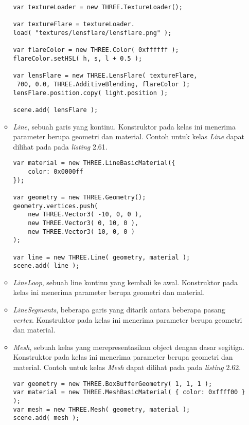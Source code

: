 \begin{itemize}
\begin{itemize}
\begin{lstlisting}[caption={Contoh penggunaan kelas {\it LensFlare}.},captionpos=b]
var textureLoader = new THREE.TextureLoader();

var textureFlare = textureLoader.
load( "textures/lensflare/lensflare.png" );

var flareColor = new THREE.Color( 0xffffff );
flareColor.setHSL( h, s, l + 0.5 );

var lensFlare = new THREE.LensFlare( textureFlare,
 700, 0.0, THREE.AdditiveBlending, flareColor );
lensFlare.position.copy( light.position );

scene.add( lensFlare );
\end{lstlisting}
	
	\item {\it Line}, sebuah garis yang kontinu. Konstruktor pada kelas ini menerima parameter berupa geometri dan material. Contoh untuk kelas {\it Line} dapat dilihat pada pada {\it listing} 2.61.
	
\begin{lstlisting}[caption={Contoh penggunaan kelas {\it Line}.},captionpos=b]
var material = new THREE.LineBasicMaterial({
	color: 0x0000ff
});

var geometry = new THREE.Geometry();
geometry.vertices.push(
	new THREE.Vector3( -10, 0, 0 ),
	new THREE.Vector3( 0, 10, 0 ),
	new THREE.Vector3( 10, 0, 0 )
);

var line = new THREE.Line( geometry, material );
scene.add( line );
\end{lstlisting}
	
	\item {\it LineLoop}, sebuah line kontinu yang kembali ke awal. Konstruktor pada kelas ini menerima parameter berupa geometri dan material.
	
	\item {\it LineSegments}, beberapa garis yang ditarik antara beberapa pasang {\it vertex}. Konstruktor pada kelas ini menerima parameter berupa geometri dan material.
	
	\item {\it Mesh}, sebuah kelas yang merepresentasikan object dengan dasar segitiga. Konstruktor pada kelas ini menerima parameter berupa geometri dan material. Contoh untuk kelas {\it Mesh} dapat dilihat pada pada {\it listing} 2.62.
	
\begin{lstlisting}[caption={Contoh penggunaan kelas {\it Mesh}.},captionpos=b]
var geometry = new THREE.BoxBufferGeometry( 1, 1, 1 );
var material = new THREE.MeshBasicMaterial( { color: 0xffff00 } );
var mesh = new THREE.Mesh( geometry, material );
scene.add( mesh );
\end{lstlisting}
	

\end{itemize}
\end{itemize}
